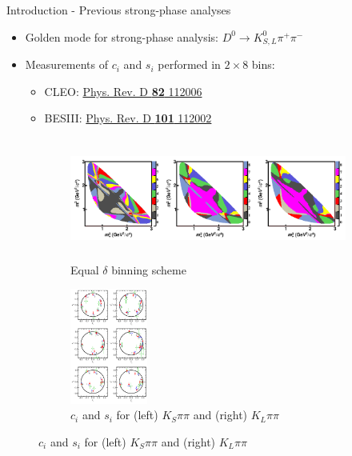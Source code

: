 \documentclass{beamer}
\begin{document}
\begin{frame}{Introduction - Previous strong-phase analyses}
  \begin{itemize}
    \setlength\itemsep{1.0em}
    \item{Golden mode for strong-phase analysis: $D^0\to K_{S, L}^0\pi^+\pi^-$}
    \item{Measurements of $c_i$ and $s_i$ performed in $2\times 8$ bins:}
    \begin{itemize}
      \item{CLEO: \href{https://journals.aps.org/prd/abstract/10.1103/PhysRevD.82.112006}{Phys. Rev. D \textbf{82} 112006}}
      \item{BESIII: \href{https://journals.aps.org/prd/abstract/10.1103/PhysRevD.101.112002}{Phys. Rev. D \textbf{101} 112002}}
    \end{itemize}
  \end{itemize}
  \begin{figure}
    \centering
    \begin{subfigure}{0.33\textwidth}
      \centering
      \includegraphics[height=4cm,trim={0 0 14cm 0},clip=true]{Plots/KSpipi_BinningScheme.pdf}
      \caption{Equal $\delta$ binning scheme}
    \end{subfigure}%
    \begin{subfigure}{0.67\textwidth}
      \centering
      \includegraphics[height=3.8cm,trim={0 16.5cm 0 0},clip=true]{Plots/KSpipi_cisi.pdf}
      \caption{$c_i$ and $s_i$ for (left) $K_S\pi\pi$ and (right) $K_L\pi\pi$}
    \end{subfigure}
  \end{figure}
\end{frame}
\end{document}

